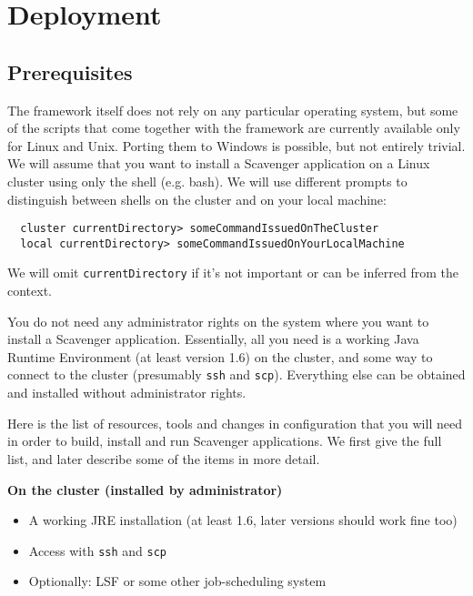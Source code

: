 \documentclass{scrbook}
\begin{document}
\chapter{Deployment}
\section{Prerequisites}
The framework itself does not rely on any particular operating system,
but some of the scripts that come together with the framework are
currently available only for Linux and Unix. 
Porting them to Windows is possible, but not entirely trivial.
We will assume that you want to install a Scavenger application 
on a Linux cluster using only the shell (e.g. bash).
We will use different prompts to distinguish between shells on
the cluster and on your local machine:
\begin{lstlisting}
  cluster currentDirectory> someCommandIssuedOnTheCluster
  local currentDirectory> someCommandIssuedOnYourLocalMachine
\end{lstlisting}
We will omit \lstinline{currentDirectory} 
if it's not important or can be inferred
from the context.

You do not need any administrator rights on the system where you want
to install a Scavenger application.
Essentially, all you need is a working Java Runtime Environment 
(at least version 1.6) on the cluster, and some way to connect to the cluster 
(presumably \lstinline{ssh} and \lstinline{scp}). Everything else can be
obtained and installed without administrator rights.

Here is the list of resources, tools and changes in configuration
that you will need in order to build, install and run Scavenger applications. 
We first give the full list, and later describe some of the items in more detail.

\noindent\textbf{On the cluster (installed by administrator)}
\begin{itemize}
  \item A working JRE installation 
    (at least 1.6, later versions should work fine too)
  \item Access with \lstinline{ssh} and \lstinline{scp}
  \item Optionally: LSF or some other job-scheduling system
\end{itemize}
\end{document}
